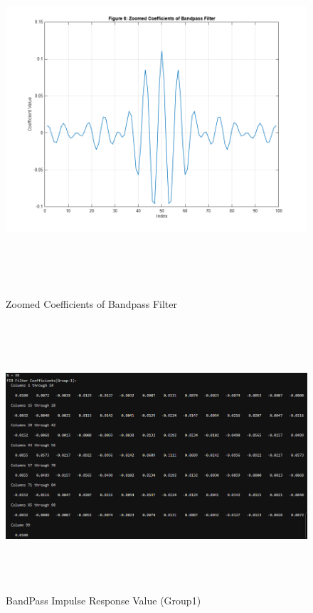 \documentclass[12pt]{article}
\begin{document}
\begin{figure}[H]
    \centering
    \includegraphics[height=13cm]{g16.png}
    \caption{Zoomed Coefficients of Bandpass Filter}
    \label{fig:zoomed_coefficients}
\end{figure}

\begin{figure}[H]
    \centering
    \includegraphics[height=10cm]{g19.png}
    \caption{BandPass Impulse Response Value (Group1)}
    \label{fig:fir_coefficients_g1}
\end{figure}
\end{document}
